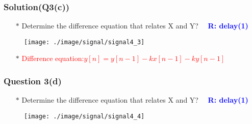 \documentclass{beamer}
\newcommand{\blue}[1]{\textcolor{blue}{#1}}
\newcommand{\red}[1]{\textcolor{red}{#1}}
\begin{document}
\begin{frame}
\frametitle{Solution(Q3(c))}

\begin{itemize} \itemsep1pt \parskip0pt 
  \item[$\ast$] Determine the difference equation that relates X and Y?  ~~\blue{\bf R: delay(1)}
\end{itemize}
\vspace{10 mm}


\begin{figure}[H]
  \centering
  \texttt{[image: ./image/signal/signal4\_3]}
\end{figure}
\vspace{10 mm}

\begin{itemize} \itemsep1pt \parskip0pt 
  \item[$\ast$] \red{Difference equation:$y[n] = y[n-1] - kx[n-1] - ky[n-1]$}
\end{itemize}

\end{frame}


\begin{frame}
\frametitle{Question 3(d)}

\begin{itemize} \itemsep1pt \parskip0pt 
  \item[$\ast$] Determine the difference equation that relates X and Y?  ~~\blue{\bf R: delay(1)}
\end{itemize}
\vspace{10 mm}


\begin{figure}[H]
  \centering
  \texttt{[image: ./image/signal/signal4\_4]}
\end{figure}


\end{frame}

\end{document}
